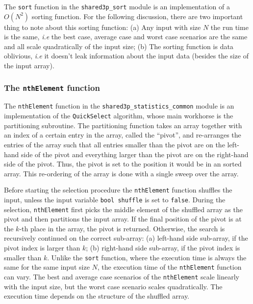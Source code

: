 \documentclass[11pt]{article}
\newcommand{\ct}[1]{\texttt{#1}}
\begin{document}
The \ct{sort} function in the \ct{shared3p\_sort} module is an implementation of a $O(N^2)$ sorting function. For the following discussion, there are two important thing to note about this sorting function: (a) Any input with size $N$ the run time is the same, \emph{i.e} the best case, average case and worst case scenarios are the same and all scale quadratically of the input size; (b) The sorting function is data oblivious, \emph{i.e} it doesn't leak information about the input data (besides the size of the input array).  



\subsubsection{The \ct{nthElement} function} %
\label{ssub:the_nthelement_function}

The \ct{nthElement} function in the \ct{shared3p\_statistics\_common} module is an implementation of the \ct{QuickSelect} algorithm, whose main workhorse is the partitioning subroutine. The partitioning function takes an array together with an index of a certain entry in the array, called the ``pivot'', and re-arranges the entries of the array such that all entries smaller than the pivot are on the left-hand side of the pivot and everything larger than the pivot are on the right-hand side of the pivot. Thus, the pivot is set to the position it would be in an sorted array. This re-ordering of the array is done with a single sweep over the array. 

Before starting the selection procedure the \ct{nthElement} function shuffles the input, unless the input variable \ct{bool shuffle} is set to \ct{false}. During the selection, \ct{nthElement} first picks the middle element of the shuffled array as the pivot and then partitions the input array. If the final position of the pivot is at the $k$-th place in the array, the pivot is returned. Otherwise, the search is recursively continued on the correct sub-array: (a) left-hand side sub-array, if the pivot index is larger than $k$; (b) right-hand side sub-array, if the pivot index is smaller than $k$. Unlike the \ct{sort} function, where the execution time is always the same for the same input size $N$, the execution time of the \ct{nthElement} function can vary. The best and average case scenarios of the \ct{nthElement} scale linearly with the input size, but the worst case scenario scales quadratically. The execution time depends on the structure of the shuffled array. 
\end{document}
